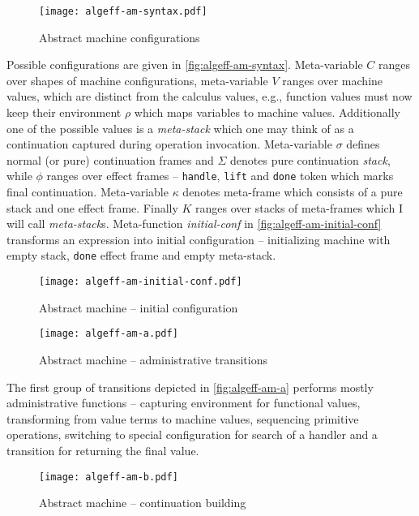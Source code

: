 \documentclass[inz, english, longabstract]{iithesis}
\begin{document}
\begin{figure}[t]
  \centering
  \texttt{[image: algeff-am-syntax.pdf]}
  \caption{Abstract machine configurations}
  \label{fig:algeff-am-syntax}
\end{figure}

Possible configurations are given in \autoref{fig:algeff-am-syntax}.
Meta-variable $ C $ ranges over shapes of machine configurations, meta-variable $ V $ ranges over machine values, which are distinct from the calculus values, e.g., function values must now keep their environment $ \rho $ which maps variables to machine values.
Additionally one of the possible values is a \emph{meta-stack} which one may think of as a continuation captured during operation invocation.
Meta-variable $ \sigma $ defines normal (or pure) continuation frames and $ \Sigma $ denotes pure continuation \emph{stack}, while $ \phi $ ranges over effect frames -- \texttt{handle}, \texttt{lift} and \texttt{done} token which marks final continuation.
Meta-variable $ \kappa $ denotes meta-frame which consists of a pure stack and one effect frame.
Finally $ K $ ranges over stacks of meta-frames which I will call \emph{meta-stack}s.
Meta-function \textit{initial-conf} in \autoref{fig:algeff-am-initial-conf} transforms an expression into initial configuration -- initializing machine with empty stack, \texttt{done} effect frame and empty meta-stack.

\begin{figure}[t]
  \centering
  \texttt{[image: algeff-am-initial-conf.pdf]}
  \caption{Abstract machine -- initial configuration}
  \label{fig:algeff-am-initial-conf}
\end{figure}

\begin{figure}[t]
  \centering
  \texttt{[image: algeff-am-a.pdf]} 
  \caption{Abstract machine -- administrative transitions}
  \label{fig:algeff-am-a}
\end{figure}

The first group of transitions depicted in \autoref{fig:algeff-am-a} performs mostly administrative functions -- capturing environment for functional values, transforming from value terms to machine values, sequencing primitive operations, switching to special configuration for search of a handler and a transition for returning the final value.

\begin{figure}[t]
  \centering
  \texttt{[image: algeff-am-b.pdf]} 
  \caption{Abstract machine -- continuation building}
  \label{fig:algeff-am-b}
\end{figure}
\end{document}
